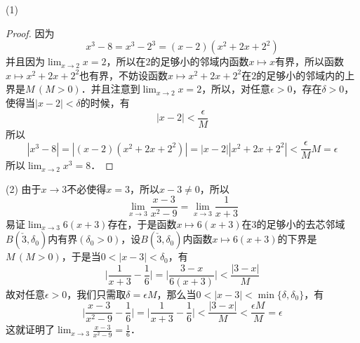 \noindent (1)
\begin{proof}
因为
\begin{equation}
    x^3 - 8 = x^3 - 2^3 = (x-2)(x^2 + 2x + 2^2)
\end{equation}
并且因为$\displaystyle\lim_{x \to 2} x = 2$，所以在$2$的足够小的邻域内函数$x \longmapsto x$有界，所以函数$x \longmapsto x^2+2x+2^2$也有界，不妨设函数$x \longmapsto x^2+2x+2^2$在$2$的足够小的邻域内的上界是$M \, (M > 0)$．并且注意到$\displaystyle\lim_{x \to 2} x = 2$，所以，对任意$\epsilon > 0$，存在$\delta > 0$，使得当$|x - 2| < \delta$的时候，有
\begin{equation}
    |x - 2| < \frac{\epsilon}{M}
\end{equation}
所以
\begin{equation}
    |x^3-8|=|(x-2)(x^2+2x+2^2)|=|x-2||x^2+2x+2^2|<\frac{\epsilon}{M}M=\epsilon
\end{equation}
所以$\displaystyle\lim_{x \to 2} x^3 = 8$．
\end{proof} 

\noindent (2)
由于$x \to 3$不必使得$x = 3$，所以$x-3 \neq 0$，所以
\begin{equation}
    \lim_{x \to 3} \frac{x-3}{x^2 - 9} = \lim_{x \to 3} \frac{1}{x+3}
\end{equation}
易证$\displaystyle\lim_{x \to 3} 6(x+3)$存在，于是函数$x \longmapsto 6(x+3)$在$3$的足够小的去芯邻域$B(\check{3}, \delta_0)$内有界$(\delta_0 > 0)$，设$B(\check{3}, \delta_0)$内函数$x \longmapsto 6(x+3)$的下界是$M \, (M > 0)$，于是当$0<|x-3|<\delta_0$，有
\begin{equation}
    \bigg\lvert \frac{1}{x+3}-\frac{1}{6} \bigg\rvert= \bigg\lvert \frac{3-x}{6(x+3)} \bigg\rvert<\frac{|3-x|}{M}
\end{equation}
故对任意$\epsilon > 0$，我们只需取$\delta = \epsilon M$，那么当$0<|x-3|<\min\{\delta, \delta_0 \}$，有
\begin{equation}
    \bigg\lvert \frac{x-3}{x^2-9} - \frac{1}{6} \bigg\rvert = \bigg\lvert \frac{1}{x+3} - \frac{1}{6} \bigg\rvert < \frac{|3-x|}{M} < \frac{\epsilon M}{M} = \epsilon
\end{equation}
这就证明了$\displaystyle\lim_{x \to 3} \displaystyle\frac{x-3}{x^2-9} = \displaystyle\frac{1}{6}$．

